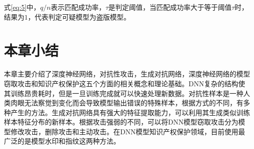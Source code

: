 \noindent 式\ref{eq:5}中，$q/n$表示匹配成功率，$\tau$是判定阈值，当匹配成功率大于等于阈值$\tau$时，结果为$1$，代表判定可疑模型为盗版模型。


\section{本章小结}

本章主要介绍了深度神经网络，对抗性攻击，生成对抗网络，深度神经网络的模型窃取攻击和知识产权保护这五个方面的相关概念和理论基础。DNN复杂的结构使其训练昂贵耗时，但是一旦训练完成就可以快速处理新数据。对抗性样本是一种人类肉眼无法察觉到变化而会导致模型输出错误的特殊样本，根据方式的不同，有多种产生的方法。生成对抗网络具有强大的特征提取能力，可以利用其生成类似训练样本特征分布的新样本。根据攻击强弱的不同，可以将DNN模型窃取攻击分为模型修改攻击，删除攻击和主动攻击。在DNN模型知识产权保护领域，目前使用最广泛的是模型水印和指纹这两种方法。
